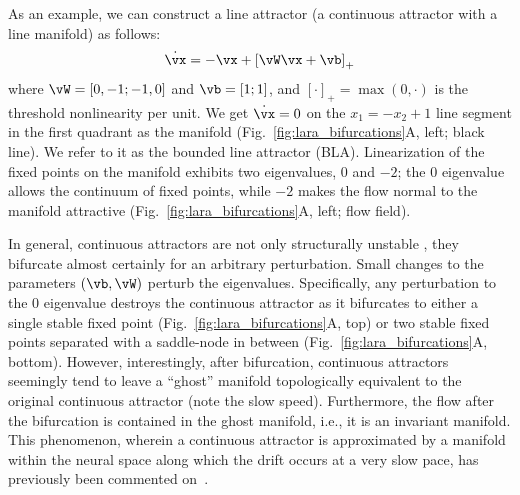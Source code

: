 \documentclass{article} %
\newcounter{ct}
\newcommand{\reals}{\mathbb{R}}
\theoremstyle{definition}
\theoremstyle{remark}
\begin{document}
As an example, we can construct a line attractor (a continuous attractor with a line manifold) as follows:
\begin{align}\label{eq:TLN}
    \dot{\vx} = -\vx + \left[ \vW \vx + \vb \right]_{+}
\end{align}where \(\vW = [0, -1; -1, 0]\) and \(\vb = [1; 1]\), and \([\cdot]_{+} = \max(0,\cdot)\) is the threshold nonlinearity per unit.
We get \(\dot{\vx} = 0\) on the \(x_{1} = -x_{2} + 1\) line segment in the first quadrant as the manifold (Fig.~\ref{fig:lara_bifurcations}A, left; black line).
We refer to it as the bounded line attractor (BLA).
Linearization of the fixed points on the manifold exhibits two eigenvalues, \(0\) and \(-2\);
the \(0\) eigenvalue allows the continuum of fixed points, while \(-2\) makes the flow normal to the manifold attractive (Fig.~\ref{fig:lara_bifurcations}A, left; flow field).

In general, continuous attractors are not only structurally unstable \citep{mane1987proof}, they bifurcate almost certainly for an arbitrary perturbation.
Small changes to the parameters \((\vb,\vW)\) perturb the eigenvalues.
Specifically, any perturbation to the \(0\) eigenvalue destroys the continuous attractor as it bifurcates to either
a single stable fixed point (Fig.~\ref{fig:lara_bifurcations}A, top) or two stable fixed points separated with a saddle-node in between (Fig.~\ref{fig:lara_bifurcations}A, bottom).
However, interestingly, after bifurcation, continuous attractors seemingly tend to leave a ``ghost'' manifold topologically equivalent to the original continuous attractor (note the slow speed).
Furthermore, the flow after the bifurcation is contained in the ghost manifold, i.e., it is an invariant manifold.
This phenomenon, wherein a continuous attractor is approximated by a manifold within the neural space along which the drift occurs at a very slow pace, has previously been commented on~\citep{seung1997learning,mante2013context,schmidt2019identifying}.
\end{document}
